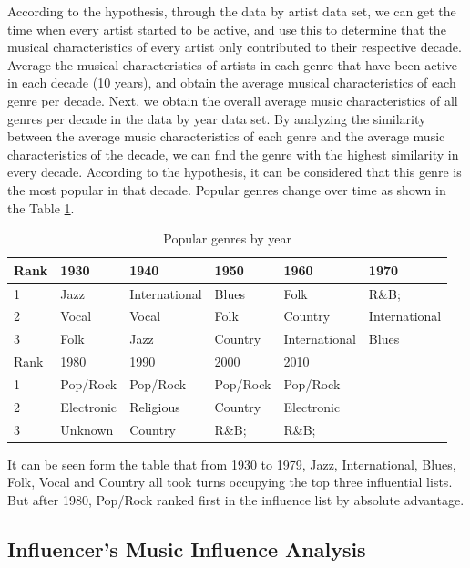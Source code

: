 \documentclass[12pt]{article}  %
\begin{document}
According to the hypothesis, through the data by artist data set, we can get the time when every artist started to be active, and use this to determine that the musical characteristics of every artist only contributed to their respective decade. Average the musical characteristics of artists in each genre that have been active in each decade (10 years), and obtain the average musical characteristics of each genre per decade. Next, we obtain the overall average music characteristics of all genres per decade in the data by year data set. By analyzing the similarity between the average music characteristics of each genre and the average music characteristics of the decade, we can find the genre with the highest similarity in every decade. According to the hypothesis, it can be considered that this genre is the most popular in that decade. Popular genres change over time as shown in the Table \ref{tab:Popular genre}.

\begin{table}[htbp]
\centering
\caption{Popular genres by year}
\label{tab:Popular genre}
\begin{tabular}{l|lllll}
Rank & 1930       & 1940          & 1950     & 1960          & 1970          \\ \hline
1    & Jazz       & International & Blues    & Folk          & R\&B;         \\
2    & Vocal      & Vocal         & Folk     & Country       & International \\
3    & Folk       & Jazz          & Country  & International & Blues         \\ \hline
Rank & 1980       & 1990          & 2000     & 2010          &               \\ \hline
1    & Pop/Rock   & Pop/Rock      & Pop/Rock & Pop/Rock      &               \\
2    & Electronic & Religious     & Country  & Electronic    &               \\
3    & Unknown    & Country       & R\&B;    & R\&B;         &              \end{tabular}
\end{table}

It can be seen form the table that from 1930 to 1979, Jazz, International, Blues, Folk, Vocal and Country all took turns occupying the top three influential lists. But after 1980, Pop/Rock ranked first in the influence list by absolute advantage.


\subsection{Influencer's Music Influence Analysis }
\end{document}
